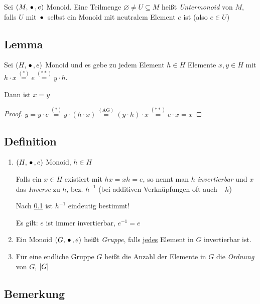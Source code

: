  Sei $(M, \,{\bullet}\,, e)$ Monoid. Eine Teilmenge $\varnothing \neq U \subseteq M$ heißt \emph{Untermonoid} von $M$, falls $U$ mit $\,{\bullet}\,$ selbst ein Monoid mit neutralem Element $e$ ist (also $e \in U$)

 \subsection[Lemma: Inverses eindeutig]{Lemma} \label{neutElemEindeutig}
 
 Sei $(H, \,{\bullet}\,, e)$ Monoid und es gebe zu jedem Element $h \in H$ Elemente $x, y \in H$ mit ${h \cdot x \stackrel{(*)}{=} e \stackrel{(**)}{=} y \cdot h}$.
 
 Dann ist $x = y$
 
 \begin{proof}
 	$y = y \cdot e \stackrel{(*)}{=} y \cdot (h \cdot x) \stackrel{(\text{AG})}{=} (y \cdot h) \cdot x \stackrel{(**)}{=} e \cdot x = x$
 \end{proof}
 
 \subsection[Definition: Gruppe, Inverse, Ordnung]{Definition}
 
 {\renewcommand{\labelenumi}{(\roman{enumi})}
 \begin{enumerate}
 
 	\item
 	$(H, \,{\bullet}\,, e)$ Monoid, $h \in H$
 	
 	Falls ein $x \in H$ existiert mit $hx = xh = e$, so nennt man $h$ \emph{invertierbar} und $x$ das \emph{Inverse} zu $h$, bez. $h^{-1}$
 	(bei additiven Verknüpfungen oft auch $-h$)
 	
 	Nach \ref{neutElemEindeutig} ist $h^{-1}$ eindeutig bestimmt!
 	
 	Es gilt: $e$ ist immer invertierbar, $e^{-1} = e$
 	
 	\item
 	Ein Monoid $(G, \,{\bullet}\,, e)$ heißt \emph{Gruppe}, falls \underline{jedes} Element in $G$ invertierbar ist.
 	
 	\item
 	Für eine endliche Gruppe $G$ heißt die Anzahl der Elemente in $G$ die \emph{Ordnung} von $G$, $\left|G\right|$
 	
 \end{enumerate}
 }
 
 
 \subsection{Bemerkung}
 

